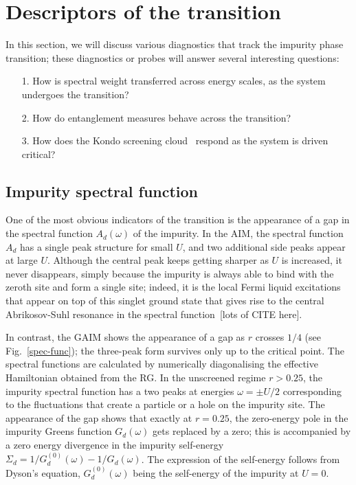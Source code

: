\documentclass[reprint,superscriptaddress,floatfix]{revtex4-2}
\begin{document}
\section{Descriptors of the transition}
\label{descr}

In this section, we will discuss various diagnostics that track the impurity phase transition; these diagnostics or probes will answer several interesting questions:
\begin{itemize}
	\item[1.] How is spectral weight transferred across energy scales, as the system undergoes the transition?
	\item[2.] How do entanglement measures behave across the transition?
	\item[3.] How does the Kondo screening cloud~\cite{sorensen_erik_affleck_1996,affleck_ian_2001,simon_pascal_2003,martin2010,martin2019} respond as the system is driven critical?
\end{itemize}

\subsection{Impurity spectral function}

One of the most obvious indicators of the transition is the appearance of a gap in the spectral function \(A_d(\omega)\) of the impurity. In the AIM, the spectral function \(A_d\) has a single peak structure for small \(U\), and two additional side peaks appear at large \(U\). Although the central peak keeps getting sharper as \(U\) is increased, it never disappears, simply because the impurity is always able to bind with the zeroth site and form a single site; indeed, it is the local Fermi liquid excitations that appear on top of this singlet ground state that gives rise to the central Abrikosov-Suhl resonance in the spectral function~\cite{}[lots of CITE here].

In contrast, the GAIM shows the appearance of a gap as \(r\) crosses \(1/4\) (see Fig.~\ref{spec-func}); the three-peak form survives only up to the critical point. The spectral functions are calculated by numerically diagonalising the effective Hamiltonian obtained from the RG. In the unscreened regime \(r > 0.25\), the impurity spectral function has a two peaks at energies \(\omega = \pm U/2\) corresponding to the fluctuations that create a particle or a hole on the impurity site. The appearance of the gap shows that exactly at \(r=0.25\), the zero-energy pole in the impurity Greens function \(G_d(\omega)\) gets replaced by a zero; this is accompanied by a zero energy divergence in the impurity self-energy \(\Sigma_d = 1/G_d^{(0)}(\omega) - 1/G_d(\omega)\). The expression of the self-energy follows from Dyson's equation, \(G_d^{(0)}(\omega)\) being the self-energy of the impurity at \(U=0\).
\end{document}

